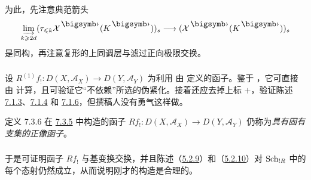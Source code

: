 为此，先注意典范箭头
\[
\varinjlim_{k\geq 2d} (\tau_{\leq k}
\Xx^{\bigdot}(K^{\bigdot}))_{s}\longrightarrow
(\Xx^{\bigdot}(K^{\bigdot}))_{s}
\]
是同构，再注意复形的上同调层与滤过正向极限交换。

\setcounter{subsubsection}{4}
\subsubsection{}
设 $R^{(1)}f_{!}:D(X,\mathcal{A}_{X})\rightarrow
D(Y,\mathcal{A}_{Y})$ 为利用  由  定义的函子。鉴于 ，它可直接由  计算，且可验证它“不依赖”所选的伪紧化。接着还应去掉上标 $+$，验证陈述 \hyperref[XVII.constru7.1.3]{7.1.3}、\hyperref[XVII.constru7.1.4]{7.1.4} 和 \hyperref[XVII.prop7.1.6]{7.1.6}，但撰稿人没有勇气这样做。

\begin{enonce*}{定义 7.3.6}
在 \hyperref[XVII.subsubsec7.3.5]{7.3.5} 中构造的函子 $Rf_{!}:D(X,\mathcal{A}_{X})\rightarrow
D(Y,\mathcal{A}_{Y})$ 仍称为\emph{具有固有支集的正像函子}。
\end{enonce*}

\setcounter{subsubsection}{6}
\subsubsection{}
于是可证明函子 $Rf_{!}$ 与基变换交换，并且陈述（\hyperref[XVII.prop5.2.9]{5.2.9}）和（\hyperref[XVII.thm5.2.10]{5.2.10}）对 $\operatorname{Sch}_{!R}$ 中的每个态射仍然成立，从而说明刚才的构造是合理的。


